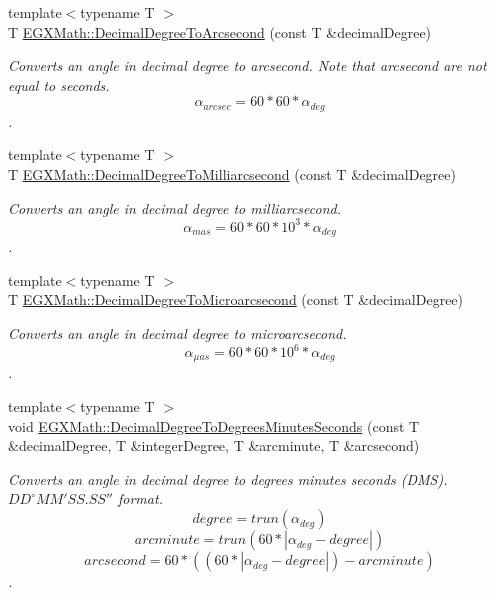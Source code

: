 \begin{DoxyCompactItemize}
{\footnotesize template$<$typename T $>$ }\\T \mbox{\hyperlink{group___e_g_x_math-_angle_conversions-_decimal_degree_gab9d5635a6e35127b5245978aba508962}{E\+G\+X\+Math\+::\+Decimal\+Degree\+To\+Arcsecond}} (const T \&decimal\+Degree)
\begin{DoxyCompactList}\small\item\em Converts an angle in decimal degree to arcsecond. Note that arcsecond are not equal to seconds. \[\alpha_{arcsec}=60 * 60 * \alpha_{deg}\]. \end{DoxyCompactList}\item 
{\footnotesize template$<$typename T $>$ }\\T \mbox{\hyperlink{group___e_g_x_math-_angle_conversions-_decimal_degree_gadb9ff3c92cf7484793f91e7de80c222e}{E\+G\+X\+Math\+::\+Decimal\+Degree\+To\+Milliarcsecond}} (const T \&decimal\+Degree)
\begin{DoxyCompactList}\small\item\em Converts an angle in decimal degree to milliarcsecond. \[\alpha_{mas}=60 * 60 * 10^3 * \alpha_{deg} \]. \end{DoxyCompactList}\item 
{\footnotesize template$<$typename T $>$ }\\T \mbox{\hyperlink{group___e_g_x_math-_angle_conversions-_decimal_degree_ga6fa88456069907fd24716fa575517571}{E\+G\+X\+Math\+::\+Decimal\+Degree\+To\+Microarcsecond}} (const T \&decimal\+Degree)
\begin{DoxyCompactList}\small\item\em Converts an angle in decimal degree to microarcsecond. \[\alpha_{\mu as}=60 * 60 * 10^6 * \alpha_{deg}\]. \end{DoxyCompactList}\item 
{\footnotesize template$<$typename T $>$ }\\void \mbox{\hyperlink{group___e_g_x_math-_angle_conversions-_decimal_degree_gac5a5255c8d120f71b60d8f60de1a1b6e}{E\+G\+X\+Math\+::\+Decimal\+Degree\+To\+Degrees\+Minutes\+Seconds}} (const T \&decimal\+Degree, T \&integer\+Degree, T \&arcminute, T \&arcsecond)
\begin{DoxyCompactList}\small\item\em Converts an angle in decimal degree to degrees minutes seconds (D\+MS). ${DD}^{\circ}{MM}'{SS.SS}''$ format. \[degree=trun(\alpha_{deg})\] \[arcminute=trun(60 * |\alpha_{deg} - degree|)\] \[arcsecond=60 * ((60 * |\alpha_{deg} - degree|)-arcminute)\]. \end{DoxyCompactList}\item 

\end{DoxyCompactItemize}
